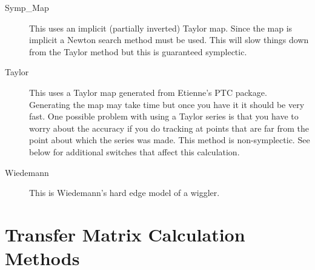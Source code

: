 \begin{description}
\item[Symp\_Map]
This uses an implicit (partially inverted) Taylor map.
Since the map is implicit a Newton search method must be used. This will slow
things down from the Taylor method but this is guaranteed symplectic.

\item[Taylor]
This uses a Taylor map generated from Etienne's PTC package. Generating
the map may take time but once you have it it should be very fast. One
possible problem with using a Taylor series is that you have to worry about
the accuracy if you do tracking at points that are far from the point about
which the series was made. This method is non-symplectic. See below for
additional switches that affect this calculation.

\item[Wiedemann]
This is Wiedemann's hard edge model of a wiggler.

\end{description}

\section{Transfer Matrix Calculation Methods}
\label{s:xfer}

